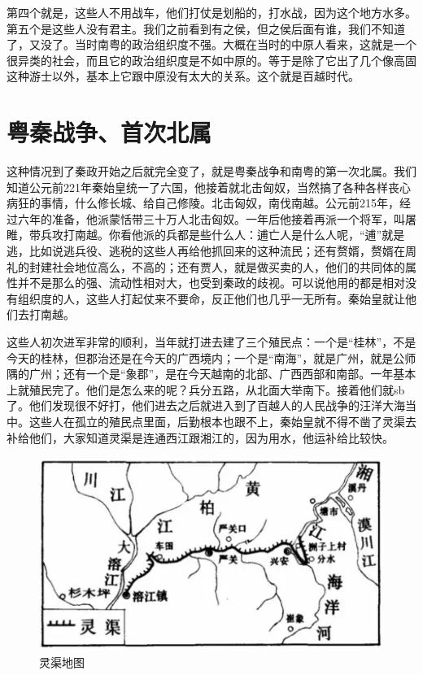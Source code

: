 第四个就是，这些人不用战车，他们打仗是划船的，打水战，因为这个地方水多。第五个是这些人没有君主。我们之前看到有之侯，但之侯后面有谁，我们不知道了，又没了。当时南粤的政治组织度不强。大概在当时的中原人看来，这就是一个很异类的社会，而且它的政治组织度是不如中原的。等于是除了它出了几个像高固这种游士以外，基本上它跟中原没有太大的关系。这个就是百越时代。


\section{粤秦战争、首次北属}

这种情况到了秦政开始之后就完全变了，就是粤秦战争和南粤的第一次北属。我们知道公元前221年秦始皇统一了六国，他接着就北击匈奴，当然搞了各种各样丧心病狂的事情，什么修长城、给自己修陵。北击匈奴，南伐南越。公元前215年，经过六年的准备，他派蒙恬带三十万人北击匈奴。一年后他接着再派一个将军，叫屠睢，带兵攻打南越。你看他派的兵都是些什么人：逋亡人是什么人呢，“逋”就是逃，比如说逃兵役、逃税的这些人再给他抓回来的这种流民；还有赘婿，赘婿在周礼的封建社会地位高么，不高的；还有贾人，就是做买卖的人，他们的共同体的属性并不是那么的强、流动性相对大，也受到秦政的歧视。可以说他用的都是相对没有组织度的人，这些人打起仗来不要命，反正他们也几乎一无所有。秦始皇就让他们去打南越。

这些人初次进军非常的顺利，当年就打进去建了三个殖民点：一个是“桂林”，不是今天的桂林，但郡治还是在今天的广西境内；一个是“南海”，就是广州，就是公师隅的广州；还有一个是“象郡”，是在今天越南的北部、广西西部和南部。一年基本上就殖民完了。他们是怎么来的呢？兵分五路，从北面大举南下。接着他们就sb了。他们发现很不好打，他们进去之后就进入到了百越人的人民战争的汪洋大海当中。这些人在孤立的殖民点里面，后勤根本也跟不上，秦始皇就不得不凿了灵渠去补给他们，大家知道灵渠是连通西江跟湘江的，因为用水，他运补给比较快。

\begin{figure}
	\centering
	\includegraphics[width=\textwidth]{images/image-7}
	\caption{灵渠地图}
\end{figure}

